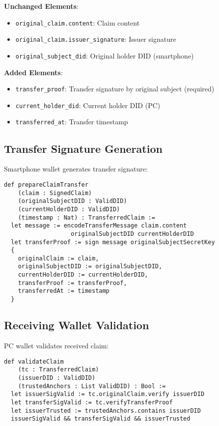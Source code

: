 \textbf{Unchanged Elements}:
\begin{itemize}
  \item \texttt{original\_claim.content}: Claim content
  \item \texttt{original\_claim.issuer\_signature}: Issuer signature
  \item \texttt{original\_subject\_did}: Original holder DID (smartphone)
\end{itemize}

\textbf{Added Elements}:
\begin{itemize}
  \item \texttt{transfer\_proof}: Transfer signature by original subject (required)
  \item \texttt{current\_holder\_did}: Current holder DID (PC)
  \item \texttt{transferred\_at}: Transfer timestamp
\end{itemize}

\subsection{Transfer Signature Generation}

Smartphone wallet generates transfer signature:

\begin{verbatim}
def prepareClaimTransfer
    (claim : SignedClaim)
    (originalSubjectDID : ValidDID)
    (currentHolderDID : ValidDID)
    (timestamp : Nat) : TransferredClaim :=
  let message := encodeTransferMessage claim.content
                   originalSubjectDID currentHolderDID
  let transferProof := sign message originalSubjectSecretKey
  {
    originalClaim := claim,
    originalSubjectDID := originalSubjectDID,
    currentHolderDID := currentHolderDID,
    transferProof := transferProof,
    transferredAt := timestamp
  }
\end{verbatim}

\subsection{Receiving Wallet Validation}

PC wallet validates received claim:

\begin{verbatim}
def validateClaim
    (tc : TransferredClaim)
    (issuerDID : ValidDID)
    (trustedAnchors : List ValidDID) : Bool :=
  let issuerSigValid := tc.originalClaim.verify issuerDID
  let transferSigValid := tc.verifyTransferProof
  let issuerTrusted := trustedAnchors.contains issuerDID
  issuerSigValid && transferSigValid && issuerTrusted
\end{verbatim}

